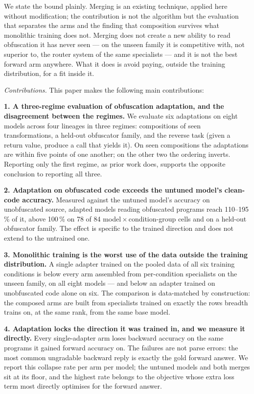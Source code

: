 We state the bound plainly. Merging is an existing technique, applied
here without modification; the contribution is not the algorithm but
the evaluation that separates the arms and the finding that
composition survives what monolithic training does not. Merging does
not create a new ability to read obfuscation it has never seen --- on
the unseen family it is competitive with, not superior to, the router system
of the same specialists --- and it is not the best forward arm
anywhere. What it does is avoid paying, outside the training
distribution, for a fit inside it.

{\em Contributions.} This paper makes the following main contributions:

\textbf{1. A three-regime evaluation of obfuscation adaptation, and the disagreement between the
regimes.} We evaluate six adaptations on eight models across four lineages in three regimes:
compositions of seen transformations, a held-out obfuscator family, and the reverse task (given a
return value, produce a call that yields it). On seen compositions the adaptations are within five
points of one another; on the other two the ordering inverts. Reporting only the first regime,
as prior work does, supports the opposite conclusion to reporting all three.

\textbf{2. Adaptation on obfuscated code exceeds the untuned model's clean-code accuracy.} Measured against the untuned model's accuracy on unobfuscated source, adapted models reading obfuscated programs reach 110--195\,\% of it, above 100\,\% on 78 of 84 model\,$\times$\,condition-group cells and on a held-out obfuscator family. The effect is specific to the trained direction and does not extend to the untrained one.

\textbf{3. Monolithic training is the worst use of the data outside the training distribution.} A
single adapter trained on the pooled data of all six training conditions is below every arm assembled
from per-condition specialists on the unseen family, on all eight models --- and below an adapter trained on unobfuscated
code alone on six. The comparison is data-matched by construction: the composed arms are built from
specialists trained on exactly the rows breadth trains on, at the same rank, from the same base model.

\textbf{4. Adaptation locks the direction it was trained in, and we measure it directly.} Every
single-adapter arm loses backward accuracy on the same programs it gained forward accuracy on. The
failures are not parse errors: the most common ungradable backward reply is exactly the gold forward
answer. We report this collapse rate per arm per model; the untuned models and both merges sit at its
floor, and the highest rate belongs to the objective whose extra loss term most directly optimises for
the forward answer.

